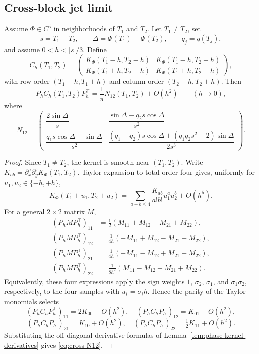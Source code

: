\subsection{Cross-block jet limit}
\label{subsec:cross-block-jet-limit}

\begin{lemma}
\label{lem:cross-block-jet-limit}
Assume \(\Phi\in C^5\) in neighborhoods of \(T_1\) and \(T_2\).  Let
\(T_1\ne T_2\), set
\[
        s=T_1-T_2,
        \qquad \Delta=\Phi(T_1)-\Phi(T_2),
        \qquad q_j=q(T_j),
\]
and assume \(0<h<|s|/3\).  Define
\[
C_h(T_1,T_2)=
\begin{pmatrix}
K_\Phi(T_1-h,T_2-h)&K_\Phi(T_1-h,T_2+h)\\
K_\Phi(T_1+h,T_2-h)&K_\Phi(T_1+h,T_2+h)
\end{pmatrix},
\]
with row order \((T_1-h,T_1+h)\) and column order \((T_2-h,T_2+h)\).  Then
\[
        P_hC_h(T_1,T_2)P_h^\top
        =\frac1\pi N_{12}(T_1,T_2)+O(h^2)
        \qquad (h\to0),
\]
where
\begin{equation}
\label{eq:cross-N12}
N_{12}=
\begin{pmatrix}
\dfrac{2\sin\Delta}{s}
&
\dfrac{\sin\Delta-q_2s\cos\Delta}{s^2}
\\[2.4ex]
\dfrac{q_1s\cos\Delta-\sin\Delta}{s^2}
&
\dfrac{(q_1+q_2)s\cos\Delta+(q_1q_2s^2-2)\sin\Delta}{2s^3}
\end{pmatrix}.
\end{equation}
\end{lemma}

\begin{proof}
Since \(T_1\ne T_2\), the kernel is smooth near \((T_1,T_2)\).  Write
\(K_{ab}=\partial_x^a\partial_y^bK_\Phi(T_1,T_2)\).  Taylor expansion to total
order four gives, uniformly for \(u_1,u_2\in\{-h,+h\}\),
\[
K_\Phi(T_1+u_1,T_2+u_2)
=\sum_{a+b\le4}\frac{K_{ab}}{a!b!}u_1^a u_2^b+O(h^5).
\]
For a general \(2\times2\) matrix \(M\),
\begin{align*}
(P_hMP_h^\top)_{11}
&=\tfrac12(M_{11}+M_{12}+M_{21}+M_{22}),\\
(P_hMP_h^\top)_{12}
&=\tfrac1{4h}(-M_{11}+M_{12}-M_{21}+M_{22}),\\
(P_hMP_h^\top)_{21}
&=\tfrac1{4h}(-M_{11}-M_{12}+M_{21}+M_{22}),\\
(P_hMP_h^\top)_{22}
&=\tfrac1{8h^2}(M_{11}-M_{12}-M_{21}+M_{22}).
\end{align*}
Equivalently, these four expressions apply the sign weights
\(1\), \(\sigma_2\), \(\sigma_1\), and \(\sigma_1\sigma_2\), respectively,
to the four samples with \(u_i=\sigma_i h\).  Hence the parity of the Taylor
monomials selects
\[
(P_hC_hP_h^\top)_{11}=2K_{00}+O(h^2),\quad
(P_hC_hP_h^\top)_{12}=K_{01}+O(h^2),
\]
\[
(P_hC_hP_h^\top)_{21}=K_{10}+O(h^2),\quad
(P_hC_hP_h^\top)_{22}=\tfrac12K_{11}+O(h^2).
\]
Substituting the off-diagonal derivative formulas of
Lemma~\ref{lem:phase-kernel-derivatives} gives \eqref{eq:cross-N12}.
\end{proof}

